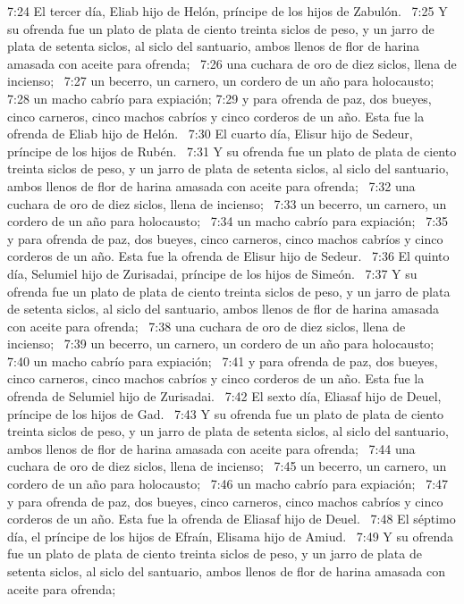 7:24 El tercer día, Eliab hijo de Helón, príncipe de los hijos de Zabulón.  
7:25 Y su ofrenda fue un plato de plata de ciento treinta siclos de peso, y un jarro de plata de setenta siclos, al siclo del santuario, ambos llenos de flor de harina amasada con aceite para ofrenda;  
7:26 una cuchara de oro de diez siclos, llena de incienso;  
7:27 un becerro, un carnero, un cordero de un año para holocausto;  
7:28 un macho cabrío para expiación; 
7:29 y para ofrenda de paz, dos bueyes, cinco carneros, cinco machos cabríos y cinco corderos de un año. Esta fue la ofrenda de Eliab hijo de Helón.  
7:30 El cuarto día, Elisur hijo de Sedeur, príncipe de los hijos de Rubén.  
7:31 Y su ofrenda fue un plato de plata de ciento treinta siclos de peso, y un jarro de plata de setenta siclos, al siclo del santuario, ambos llenos de flor de harina amasada con aceite para ofrenda;  
7:32 una cuchara de oro de diez siclos, llena de incienso;  
7:33 un becerro, un carnero, un cordero de un año para holocausto;  
7:34 un macho cabrío para expiación;  
7:35 y para ofrenda de paz, dos bueyes, cinco carneros, cinco machos cabríos y cinco corderos de un año. Esta fue la ofrenda de Elisur hijo de Sedeur.  
7:36 El quinto día, Selumiel hijo de Zurisadai, príncipe de los hijos de Simeón.  
7:37 Y su ofrenda fue un plato de plata de ciento treinta siclos de peso, y un jarro de plata de setenta siclos, al siclo del santuario, ambos llenos de flor de harina amasada con aceite para ofrenda;  
7:38 una cuchara de oro de diez siclos, llena de incienso;  
7:39 un becerro, un carnero, un cordero de un año para holocausto;  
7:40 un macho cabrío para expiación;  
7:41 y para ofrenda de paz, dos bueyes, cinco carneros, cinco machos cabríos y cinco corderos de un año. Esta fue la ofrenda de Selumiel hijo de Zurisadai.  
7:42 El sexto día, Eliasaf hijo de Deuel, príncipe de los hijos de Gad.  
7:43 Y su ofrenda fue un plato de plata de ciento treinta siclos de peso, y un jarro de plata de setenta siclos, al siclo del santuario, ambos llenos de flor de harina amasada con aceite para ofrenda;  
7:44 una cuchara de oro de diez siclos, llena de incienso;  
7:45 un becerro, un carnero, un cordero de un año para holocausto;  
7:46 un macho cabrío para expiación;  
7:47 y para ofrenda de paz, dos bueyes, cinco carneros, cinco machos cabríos y cinco corderos de un año. Esta fue la ofrenda de Eliasaf hijo de Deuel.  
7:48 El séptimo día, el príncipe de los hijos de Efraín, Elisama hijo de Amiud.  
7:49 Y su ofrenda fue un plato de plata de ciento treinta siclos de peso, y un jarro de plata de setenta siclos, al siclo del santuario, ambos llenos de flor de harina amasada con aceite para ofrenda;  
